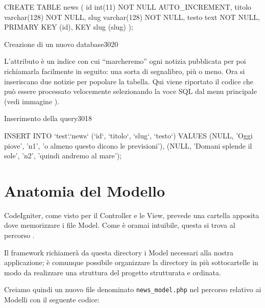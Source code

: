 \begin{code}
CREATE TABLE news (
	id int(11) NOT NULL AUTO_INCREMENT,
	titolo varchar(128) NOT NULL,
	slug varchar(128) NOT NULL,
	testo text NOT NULL,
	PRIMARY KEY (id),
	KEY slug (slug)
);
\end{code}

\begin{img}{Creazione di un nuovo database}{3}{020}
\end{img}


L'attributo  è un indice con cui ``marcheremo'' ogni notizia pubblicata per poi richiamarla facilmente in seguito: una sorta di segnalibro, più o meno. Ora si inseriscano due notizie per popolare la tabella. Qui viene riportato il codice che può essere processato velocemente selezionando la voce SQL dal menu principale (vedi immagine ).

\begin{img}{Inserimento della query}{3}{018}
\end{img}

\begin{code}
INSERT INTO `test`.`news` (`id`, `titolo`, `slug`, `testo`) 
VALUES (NULL, 'Oggi piove', 'n1', 'o almeno questo dicono le previsioni'), 
	(NULL, 'Domani splende il sole', 'n2', 'quindi andremo al mare');
\end{code}

\section*{Anatomia del Modello}
CodeIgniter, come visto per il Controller e le View, prevede una cartella apposita dove memorizzare i file Model. Come è oramai intuibile, questa si trova al percorso .

Il framework richiamerà da questa directory i Model necessari alla nostra applicazione; è comunque possibile organizzare la directory in più sottocartelle in modo da realizzare una struttura del progetto strutturata e ordinata.

Creiamo quindi un nuovo file denominato \verb|news_model.php| nel percorso relativo ai Modelli con il seguente codice:


